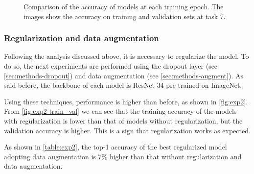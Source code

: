 \begin{figure}[H]
    \centering
    \centering
    \caption{Comparison of the accuracy of models at each training epoch. The images show the accuracy on training and validation sets at task 7.}%
    \label{fig:exp1-train_val}%
\end{figure}

\subsubsection{Regularization and data augmentation}
Following the analysis discussed above, it is necessary to regularize the model.
To do so, the next experiments are performed using the dropout layer (see \autoref{sec:methods-dropout}) and data augmentation (see \autoref{sec:methods-augment}). As said before, the backbone of each model is ResNet-34 pre-trained on ImageNet.

Using these techniques, performance is higher than before, as shown in \autoref{fig:exp2}.
From \autoref{fig:exp2-train_val} we can see that the training accuracy of the models with regularization is lower than that of models without regularization, but the validation accuracy is higher.
This is a sign that regularization works as expected.

As shown in \autoref{table:exp2}, the top-1 accuracy of the best regularized model adopting data augmentation is 7\% higher than that without regularization and data augmentation.


